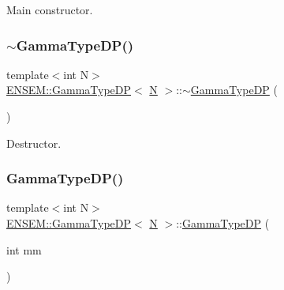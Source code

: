 Main constructor. 

\mbox{\label{classENSEM_1_1GammaTypeDP_ad0e6f055b87687dac9b7b95e6ec808b0}} 
\subsubsection{\texorpdfstring{$\sim$GammaTypeDP()}{~GammaTypeDP()}\hspace{0.1cm}{\footnotesize\ttfamily [1/2]}}
{\footnotesize\ttfamily template$<$int N$>$ \\
\mbox{\hyperlink{classENSEM_1_1GammaTypeDP}{E\+N\+S\+E\+M\+::\+Gamma\+Type\+DP}}$<$ \mbox{\hyperlink{operator__name__util_8cc_a7722c8ecbb62d99aee7ce68b1752f337}{N}} $>$\+::$\sim$\mbox{\hyperlink{classENSEM_1_1GammaTypeDP}{Gamma\+Type\+DP}} (\begin{DoxyParamCaption}{ }\end{DoxyParamCaption})\hspace{0.3cm}{\ttfamily [inline]}}



Destructor. 

\mbox{\label{classENSEM_1_1GammaTypeDP_a6a31946a6e7bde24f7bae87f6cfd2add}} 
\subsubsection{\texorpdfstring{GammaTypeDP()}{GammaTypeDP()}\hspace{0.1cm}{\footnotesize\ttfamily [2/4]}}
{\footnotesize\ttfamily template$<$int N$>$ \\
\mbox{\hyperlink{classENSEM_1_1GammaTypeDP}{E\+N\+S\+E\+M\+::\+Gamma\+Type\+DP}}$<$ \mbox{\hyperlink{operator__name__util_8cc_a7722c8ecbb62d99aee7ce68b1752f337}{N}} $>$\+::\mbox{\hyperlink{classENSEM_1_1GammaTypeDP}{Gamma\+Type\+DP}} (\begin{DoxyParamCaption}\item[{int}]{mm }\end{DoxyParamCaption})\hspace{0.3cm}{\ttfamily [inline]}}



